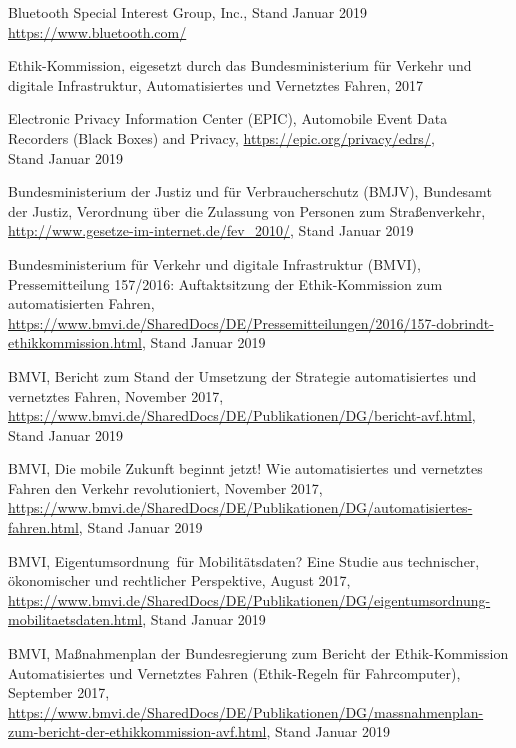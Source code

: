 \documentclass[twoside,a4paper,12pt]{article}
\begin{document}
\cleardoublepage
\begin{thebibliography}{99}

 Bluetooth Special Interest Group, Inc., Stand Januar 2019\\ \url{https://www.bluetooth.com/}

 Ethik-Kommission, eigesetzt durch das Bundesministerium für Verkehr und digitale Infrastruktur, Automatisiertes und
Vernetztes Fahren, 2017

 Electronic Privacy Information Center (EPIC), Automobile Event Data Recorders (Black Boxes) and Privacy,
\url{https://epic.org/privacy/edrs/}, \\Stand Januar 2019

 Bundesministerium der Justiz und für Verbraucherschutz (BMJV), Bundesamt der Justiz, Verordnung über die Zulassung von Personen zum Straßenverkehr, 
\url{http://www.gesetze-im-internet.de/fev_2010/}, Stand Januar 2019

 Bundesministerium für Verkehr und digitale Infrastruktur (BMVI), Pressemitteilung 157/2016: Auftaktsitzung der Ethik-Kommission zum automatisierten Fahren,
\url{https://www.bmvi.de/SharedDocs/DE/Pressemitteilungen/2016/157-dobrindt-ethikkommission.html}, Stand Januar 2019

 BMVI, Bericht zum Stand der Umsetzung der Strategie automatisiertes und vernetztes Fahren,
November 2017, \url{https://www.bmvi.de/SharedDocs/DE/Publikationen/DG/bericht-avf.html}, Stand Januar 2019

 BMVI, Die mobile Zukunft beginnt jetzt! Wie automatisiertes und vernetztes Fahren den Verkehr revolutioniert,
November 2017, \url{https://www.bmvi.de/SharedDocs/DE/Publikationen/DG/automatisiertes-fahren.html}, Stand Januar 2019

 BMVI, \glqq Eigentumsordnung\grqq\ für Mobilitätsdaten? Eine Studie aus technischer, ökonomischer und rechtlicher Perspektive,
August 2017, \url{https://www.bmvi.de/SharedDocs/DE/Publikationen/DG/eigentumsordnung-mobilitaetsdaten.html}, Stand Januar 2019

 BMVI, Maßnahmenplan der Bundesregierung zum Bericht der Ethik-Kommission Automatisiertes und Vernetztes Fahren (Ethik-Regeln für
Fahrcomputer), September 2017, \url{https://www.bmvi.de/SharedDocs/DE/Publikationen/DG/massnahmenplan-zum-bericht-der-ethikkommission-avf.html}, 
Stand Januar 2019


\end{thebibliography}
\end{document}
